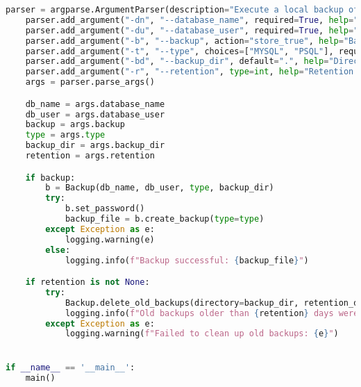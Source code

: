 \begin{lstlisting}[language=Python, caption={Python-script voor back-ups en retentiebeleid.}]
    parser = argparse.ArgumentParser(description="Execute a local backup of a database.")
    parser.add_argument("-dn", "--database_name", required=True, help="Enter the name of the database for the backup.")
    parser.add_argument("-du", "--database_user", required=True, help="Enter the username of the database for the backup.")
    parser.add_argument("-b", "--backup", action="store_true", help="Backup the database.")
    parser.add_argument("-t", "--type", choices=["MYSQL", "PSQL"], required=True, help="MYSQL or PSQL")
    parser.add_argument("-bd", "--backup_dir", default=".", help="Directory where backups are stored.")
    parser.add_argument("-r", "--retention", type=int, help="Retention period in days for keeping backups.")
    args = parser.parse_args()

    db_name = args.database_name
    db_user = args.database_user
    backup = args.backup
    type = args.type
    backup_dir = args.backup_dir
    retention = args.retention

    if backup:
        b = Backup(db_name, db_user, type, backup_dir)
        try:
            b.set_password()
            backup_file = b.create_backup(type=type)
        except Exception as e:
            logging.warning(e)
        else:
            logging.info(f"Backup successful: {backup_file}")

    if retention is not None:
        try:
            Backup.delete_old_backups(directory=backup_dir, retention_days=retention)
            logging.info(f"Old backups older than {retention} days were successfully deleted from {backup_dir}.")
        except Exception as e:
            logging.warning(f"Failed to clean up old backups: {e}")


if __name__ == '__main__':
    main()
\end{lstlisting}
